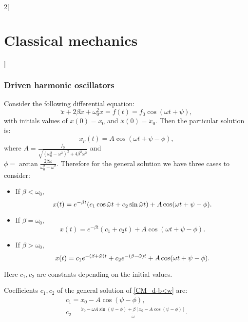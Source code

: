 \documentclass[../../../main.tex]{subfiles}
\begin{document}
\begin{multicols}{2}[\section{Classical mechanics}]
    \subsubsection{Driven harmonic oscillators}
    \begin{prop}
        Consider the following differential equation: $$\ddot{x}+2\beta\dot{x}+\omega_0^2 x=f(t)=f_0\cos(\omega t+\psi),$$ with initials values of $x(0)=x_0$ and $\dot{x}(0)=\dot{x}_0$. Then the particular solution is:
        $$x_p(t)=A\cos(\omega t+\psi-\phi),$$
        where $\displaystyle A=\frac{f_0}{\sqrt{{(\omega_0^2-\omega^2)}^2+4\beta^2\omega^2}}$ and\\ $\displaystyle\phi=\arctan{\frac{2\beta\omega}{\omega_0^2-\omega^2}}$. Therefore for the general solution we have three cases to consider:
        \begin{itemize}
            \item If $\beta<\omega_0$,
                  \begin{equation}
                      x(t)=e^{-\beta t}(c_1\cos\Tilde{\omega}t+c_2\sin\Tilde{\omega}t)+A\cos(\omega t+\psi-\phi).
                      \label{CM_d-b<w}
                  \end{equation}
            \item If $\beta=\omega_0$,
                  \begin{equation}
                      x(t)=e^{-\beta t}\left(c_1+c_2t\right)+A\cos(\omega t+\psi-\phi).
                      \label{CM_d-b=w}
                  \end{equation}
            \item If $\beta>\omega_0$,
                  \begin{equation}
                      x(t)=c_1e^{-(\beta+\Tilde{\omega})t}+c_2e^{-(\beta-\Tilde{\omega})t}+A\cos(\omega t+\psi-\phi).
                      \label{CM_d-b>w}
                  \end{equation}
        \end{itemize}
        Here $c_1,c_2$ are constants depending on the initial values.
    \end{prop}
    \begin{prop}
        Coefficients $c_1,c_2$ of the general solution of \cref{CM_d-b<w} are:
        \begin{gather*}
            c_1=x_0-A\cos\left(\psi-\phi\right),\\
            c_2=\frac{\dot{x}_0-\omega A\sin\left(\psi-\phi\right)+\beta\left[x_0-A\cos\left(\psi-\phi\right)\right]}{\tilde{\omega}}.

\end{gather*}
\end{prop}
\end{multicols}
\end{document}
